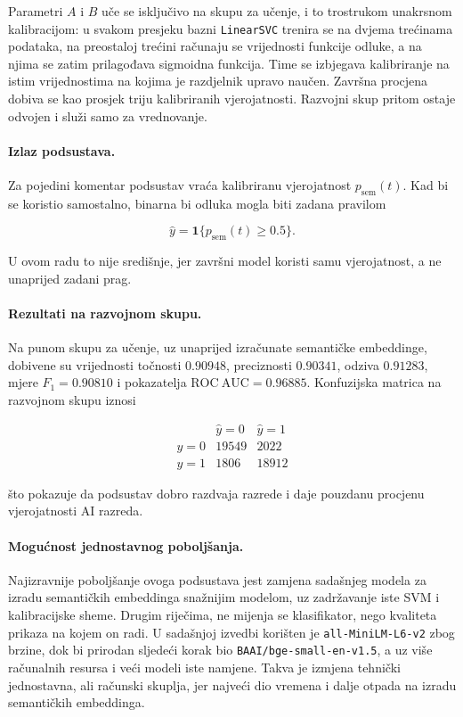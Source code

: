\documentclass{article}
\begin{document}
Parametri $A$ i $B$ uče se isključivo na skupu za učenje, i to trostrukom unakrsnom kalibracijom: u svakom presjeku bazni \texttt{LinearSVC} trenira se na dvjema trećinama podataka, na preostaloj trećini računaju se vrijednosti funkcije odluke, a na njima se zatim prilagođava sigmoidna funkcija. Time se izbjegava kalibriranje na istim vrijednostima na kojima je razdjelnik upravo naučen. Završna procjena dobiva se kao prosjek triju kalibriranih vjerojatnosti. Razvojni skup pritom ostaje odvojen i služi samo za vrednovanje.

\paragraph{Izlaz podsustava.}
Za pojedini komentar podsustav vraća kalibriranu vjerojatnost $p_{\mathrm{sem}}(t)$. Kad bi se koristio samostalno, binarna bi odluka mogla biti zadana pravilom

\[
\hat y = \mathbf{1}\{p_{\mathrm{sem}}(t)\ge 0.5\}.
\]

U ovom radu to nije središnje, jer završni model koristi samu vjerojatnost, a ne unaprijed zadani prag.

\paragraph{Rezultati na razvojnom skupu.}
Na punom skupu za učenje, uz unaprijed izračunate semantičke embeddinge, dobivene su vrijednosti točnosti $0.90948$, preciznosti $0.90341$, odziva $0.91283$, mjere $F_1=0.90810$ i pokazatelja $\mathrm{ROC\ AUC}=0.96885$. Konfuzijska matrica na razvojnom skupu iznosi

\[
\begin{array}{c|cc}
 & \hat y=0 & \hat y=1 \\
\hline
y=0 & 19549 & 2022 \\
y=1 & 1806 & 18912
\end{array}
\]

što pokazuje da podsustav dobro razdvaja razrede i daje pouzdanu procjenu vjerojatnosti AI razreda.

\paragraph{Mogućnost jednostavnog poboljšanja.}
Najizravnije poboljšanje ovoga podsustava jest zamjena sadašnjeg modela za izradu semantičkih embeddinga snažnijim modelom, uz zadržavanje iste SVM i kalibracijske sheme. Drugim riječima, ne mijenja se klasifikator, nego kvaliteta prikaza na kojem on radi. U sadašnjoj izvedbi korišten je \texttt{all-MiniLM-L6-v2} zbog brzine, dok bi prirodan sljedeći korak bio \texttt{BAAI/bge-small-en-v1.5}, a uz više računalnih resursa i veći modeli iste namjene. Takva je izmjena tehnički jednostavna, ali računski skuplja, jer najveći dio vremena i dalje otpada na izradu semantičkih embeddinga.
\end{document}
